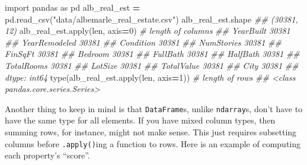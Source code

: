 \documentclass[
  12pt,
  krantz2]{krantz}
\makeatletter
\newenvironment{Shaded}{\begin{snugshade}}{\end{snugshade}}
\newcommand{\BuiltInTok}[1]{#1}
\newcommand{\CommentTok}[1]{\textcolor[rgb]{0.37,0.37,0.37}{\textit{#1}}}
\newcommand{\DecValTok}[1]{\textcolor[rgb]{0.06,0.06,0.06}{#1}}
\newcommand{\ImportTok}[1]{#1}
\newcommand{\NormalTok}[1]{#1}
\newcommand{\OperatorTok}[1]{\textcolor[rgb]{0.43,0.43,0.43}{\textbf{#1}}}
\newcommand{\StringTok}[1]{\textcolor[rgb]{0.5,0.5,0.5}{#1}}
\newenvironment{kframe}{%
\medskip{}
\setlength{\fboxsep}{.8em}
 \def\at@end@of@kframe{}%
 \ifinner\ifhmode%
  \def\at@end@of@kframe{\end{minipage}}%
  \begin{minipage}{\columnwidth}%
 \fi\fi%
 \def\FrameCommand##1{\hskip\@totalleftmargin \hskip-\fboxsep
 \colorbox{shadecolor}{##1}\hskip-\fboxsep
     \hskip-\linewidth \hskip-\@totalleftmargin \hskip\columnwidth}%
 \MakeFramed {\advance\hsize-\width
   \@totalleftmargin\z@ \linewidth\hsize
   \@setminipage}}%
 {\par\unskip\endMakeFramed%
 \at@end@of@kframe}
\renewenvironment{Shaded}{\begin{kframe}}{\end{kframe}}
\makeatother
\begin{document}
\begin{Shaded}
\begin{Highlighting}[]
\ImportTok{import}\NormalTok{ pandas }\ImportTok{as}\NormalTok{ pd}
\NormalTok{alb\_real\_est }\OperatorTok{=}\NormalTok{ pd.read\_csv(}\StringTok{"data/albemarle\_real\_estate.csv"}\NormalTok{)}
\NormalTok{alb\_real\_est.shape}
\CommentTok{\#\# (30381, 12)}
\NormalTok{alb\_real\_est.}\BuiltInTok{apply}\NormalTok{(}\BuiltInTok{len}\NormalTok{, axis}\OperatorTok{=}\DecValTok{0}\NormalTok{) }\CommentTok{\# length of columns}
\CommentTok{\#\# YearBuilt        30381}
\CommentTok{\#\# YearRemodeled    30381}
\CommentTok{\#\# Condition        30381}
\CommentTok{\#\# NumStories       30381}
\CommentTok{\#\# FinSqFt          30381}
\CommentTok{\#\# Bedroom          30381}
\CommentTok{\#\# FullBath         30381}
\CommentTok{\#\# HalfBath         30381}
\CommentTok{\#\# TotalRooms       30381}
\CommentTok{\#\# LotSize          30381}
\CommentTok{\#\# TotalValue       30381}
\CommentTok{\#\# City             30381}
\CommentTok{\#\# dtype: int64}
\BuiltInTok{type}\NormalTok{(alb\_real\_est.}\BuiltInTok{apply}\NormalTok{(}\BuiltInTok{len}\NormalTok{, axis}\OperatorTok{=}\DecValTok{1}\NormalTok{)) }\CommentTok{\# length of rows}
\CommentTok{\#\# \textless{}class \textquotesingle{}pandas.core.series.Series\textquotesingle{}\textgreater{}}
\end{Highlighting}
\end{Shaded}

Another thing to keep in mind is that \texttt{DataFrame}s, unlike \texttt{ndarray}s, don't have to have the same type for all elements. If you have mixed column types, then summing rows, for instance, might not make sense. This just requires subsetting columns before \texttt{.apply()}ing a function to rows. Here is an example of computing each property's ``score''.
\end{document}
